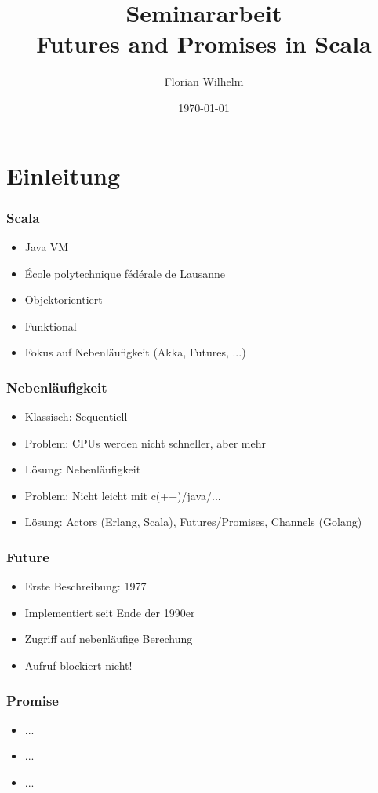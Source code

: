 \documentclass{beamer}
\title[]{Seminararbeit\\Futures and Promises in Scala}
\author{Florian Wilhelm}
\date{\today{}}
\begin{document}
\frame{
\titlepage
}


\section{Einleitung}

\setcounter{subsection}{1}
\begin{frame}
  \frametitle{Scala}
  \begin{itemize}
    \item{Java VM}
    \item{École polytechnique fédérale de Lausanne}
    \item{Objektorientiert}
    \item{Funktional}
    \item{Fokus auf Nebenläufigkeit (Akka, Futures, ...)}
   \end{itemize}
\end{frame}

\setcounter{subsection}{1}
\begin{frame}
  \frametitle{Nebenläufigkeit}
  \begin{itemize}
    \item{Klassisch: Sequentiell}
    \item{Problem: CPUs werden nicht schneller, aber mehr}
    \item{Lösung: Nebenläufigkeit}
    \item{Problem: Nicht leicht mit c(++)/java/...}
    \item{Lösung: Actors (Erlang, Scala), Futures/Promises, Channels (Golang)}
   \end{itemize}
\end{frame}


\setcounter{subsection}{1}
\begin{frame}
  \frametitle{Future}
   \begin{itemize}
    \item{Erste Beschreibung: 1977}
    \item{Implementiert seit Ende der 1990er}
    \item{Zugriff auf nebenläufige Berechung}
    \item{Aufruf blockiert nicht!}
   \end{itemize}
\end{frame}

\setcounter{subsection}{1}
\begin{frame}
  \frametitle{Promise}
   \begin{itemize}
    \item{...}
    \item{...}
    \item{...}
   \end{itemize}
\end{frame}
\end{document}
